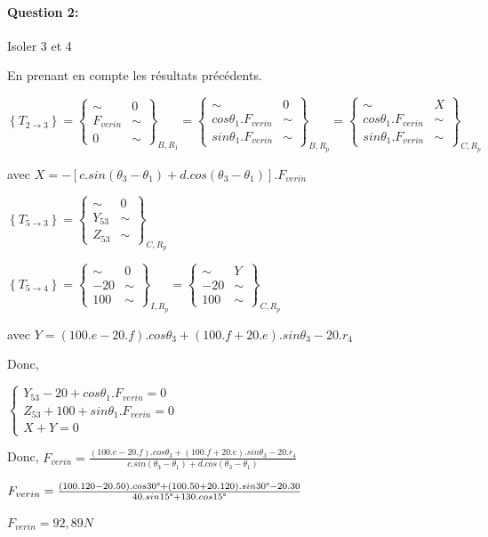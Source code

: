 \paragraph{Question 2:}

Isoler 3 et 4

En prenant en compte les résultats précédents.

$\left\{T_{2\rightarrow 3}\right\}=\left\{
\begin{array}{cc}
\sim & 0 \\
F_{verin} & \sim \\
0 & \sim
\end{array}
\right\}_{B,R_1}=\left\{
\begin{array}{cc}
\sim & 0 \\
cos\theta_1.F_{verin}  & \sim \\
sin\theta_1.F_{verin}  & \sim
\end{array}
\right\}_{B,R_p}=\left\{
\begin{array}{cc}
\sim & X \\
cos\theta_1.F_{verin} & \sim \\
sin\theta_1.F_{verin} & \sim
\end{array}
\right\}_{C,R_p}$

avec $X=-\left[c.sin(\theta_3-\theta_1)+d.cos(\theta_3-\theta_1)\right].F_{verin}$

$\left\{T_{5\rightarrow 3}\right\}=\left\{
\begin{array}{cc}
\sim & 0 \\
Y_{53} & \sim \\
Z_{53} & \sim
\end{array}
\right\}_{C,R_p}$

$\left\{T_{5\rightarrow 4}\right\}=\left\{
\begin{array}{cc}
\sim & 0 \\
-20 & \sim \\
100 & \sim
\end{array}
\right\}_{I,R_p}=\left\{
\begin{array}{cc}
\sim & Y \\
-20 & \sim \\
100 & \sim
\end{array}
\right\}_{C,R_p}$

avec $Y=(100.e-20.f).cos\theta_3+(100.f+20.e).sin\theta_3-20.r_4$

Donc,

$\left\{\begin{array}{l}
Y_{53}-20+cos\theta_1.F_{verin}=0 \\
Z_{53}+100+sin\theta_1.F_{verin}=0 \\
X+Y=0
\end{array}\right.$

Donc, $F_{verin}=\frac{(100.e-20.f).cos\theta_3+(100.f+20.e).sin\theta_3-20.r_4}{c.sin(\theta_3-\theta_1)+d.cos(\theta_3-\theta_1)}$

$F_{verin}=\frac{(100.120-20.50).cos30\degree+(100.50+20.120).sin30\degree-20.30}{40.sin15\degree+130.cos15\degree}$

$F_{verin}=92,89N$


